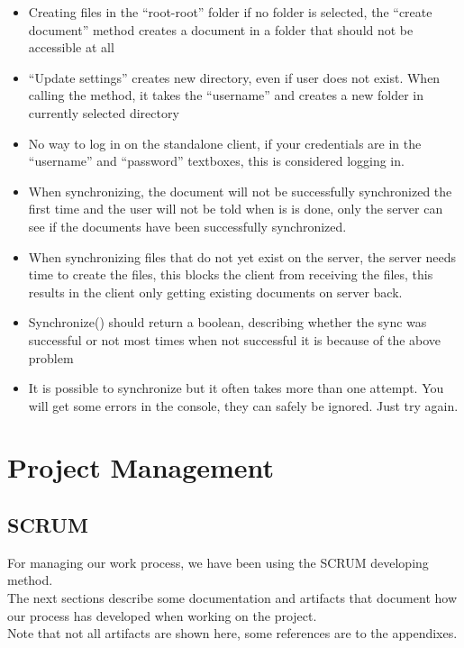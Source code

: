 \documentclass[11pt]{article}
\begin{document}
\begin{itemize}
\item Creating files in the ``root-root'' folder if no folder is selected, the 
     ``create document'' method creates a document in a folder that should not 
     be accessible at all
\item ``Update settings'' creates new directory, even if user does not exist.
     When calling the method, it takes the ``username'' and creates a new folder 
     in currently selected directory
\item No way to log in on the standalone client, if your credentials are in the 
     ``username'' and ``password'' textboxes, this is considered logging in.
\item When synchronizing, the document will not be successfully synchronized the first time
     and the user will not be told when is is done, only the server can see if the
     documents have been successfully synchronized.
\item When synchronizing files that do not yet exist on the server, the server needs time 
     to create the files, this blocks the client from receiving the files, this results in
     the client only getting existing documents on server back.
\item Synchronize() should return a boolean, describing whether the sync was successful or not
     most times when not successful it is because of the above problem
\item It is possible to synchronize but it often takes more than one attempt. You will get some errors in the console, they can safely be ignored. Just try again.
\end{itemize}

\section{Project Management}
\label{sec-5}
\subsection{SCRUM}
\label{sec-5-1}
For managing our work process, we have been using the SCRUM developing method. \\
The next sections describe some documentation and artifacts that document how our process has developed when working on the project. \\
Note that not all artifacts are shown here, some references are to the appendixes. \\
\end{document}

